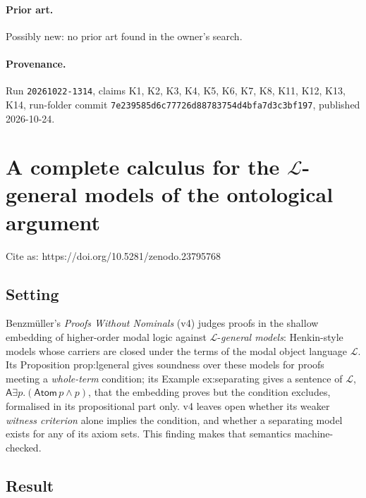 \documentclass{article}
\begin{document}
\paragraph{Prior art.} Possibly new: no prior art found in the owner's search.

\paragraph{Provenance.}
Run \texttt{20261022-1314}, claims K1, K2, K3, K4, K5, K6, K7, K8, K11, K12, K13, K14, run-folder commit \texttt{7e239585d6c77726d88783754d4bfa7d3c3bf197}, published 2026-10-24.

\section{A complete calculus for the $\mathcal{L}$-general models of the ontological argument}
\label{sec:ontological-lgeneral-semantics}

Cite as: https://doi.org/10.5281/zenodo.23795768

\subsection*{Setting}

Benzmüller's \emph{Proofs Without Nominals} \cite{benzmueller2026nominals} (v4) judges proofs in the
shallow embedding of higher-order modal logic against $\mathcal L$-\emph{general models}: Henkin-style
models whose carriers are closed under the terms of the modal object language $\mathcal L$. Its
Proposition prop:lgeneral gives soundness over these models for proofs meeting a \emph{whole-term}
condition; its Example ex:separating gives a sentence of $\mathcal L$,
$\mathsf A\exists p.(\mathsf{Atom}\,p\wedge p)$, that the embedding proves but the condition
excludes, formalised in its propositional part only. v4 leaves open whether its weaker \emph{witness
criterion} alone implies the condition, and whether a separating model exists for any of its
axiom sets. This finding makes that semantics machine-checked.

\subsection*{Result}
\end{document}
